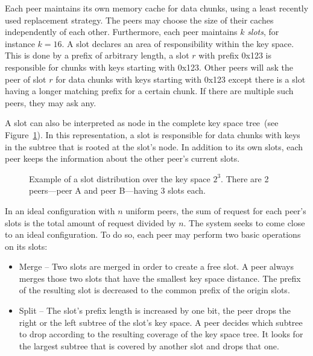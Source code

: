 Each peer maintains its own memory cache for data chunks, using a least recently used replacement strategy.
The peers may choose the size of their caches independently of each other.
Furthermore, each peer maintains $k$ \emph{slots}, for instance $k=16$.
A slot declares an area of responsibility within the key space.
This is done by a prefix of arbitrary length, \eg a slot $r$ with prefix 0x123 is responsible for chunks with keys starting with 0x123.
Other peers will ask the peer of slot $r$ for data chunks with keys starting with 0x123 except there is a slot having a longer matching prefix for a certain chunk.
If there are multiple such peers, they may ask any.

A slot can also be interpreted as node in the complete key space tree~(see Figure~\ref{fig:keyspace}).
In this representation, a slot is responsible for data chunks with keys in the subtree that is rooted at the slot's node.
In addition to its own slots, each peer keeps the information about the other peer's current slots.

\begin{figure}
	\begin{center}
		\resizebox{0.75\textwidth}{!}{}	
	\end{center}
	\caption{Example of a slot distribution over the key space $2^3$. There are 2 peers---peer A and peer B---having 3 slots each.}
	\label{fig:keyspace}
\end{figure}

In an ideal configuration with $n$ uniform peers, the sum of request for each peer's slots is the total amount of request divided by $n$.
The system seeks to come close to an ideal configuration.
To do so, each peer may perform two basic operations on its slots:
\begin{itemize}
	\item Merge --
		Two slots are merged in order to create a free slot.
		A peer always merges those two slots that have the smallest key space distance.
		The prefix of the resulting slot is decreased to the common prefix of the origin slots.
	\item Split --
		The slot's prefix length is increased by one bit, \ie the peer drops the right or the left subtree of the slot's key space.
		A peer decides which subtree to drop according to the resulting coverage of the key space tree.
		It looks for the largest subtree that is covered by another slot and drops that one.
\end{itemize}

